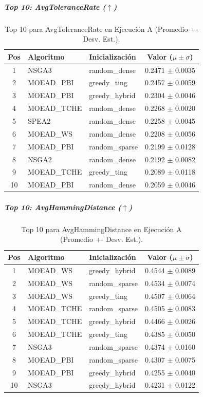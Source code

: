 \documentclass[a4paper,10pt]{article}
\begin{document}
\subparagraph{Top 10: AvgToleranceRate ($\uparrow$)}
\begin{table}[H]
    \centering
    \begin{tabular}{cllc}
        \toprule
        Pos & Algoritmo & Inicialización & Valor ($\mu \pm \sigma$) \\
        \midrule
        1 & NSGA3 & random\_dense & 0.2471 $\pm$ 0.0035 \\
        2 & MOEAD\_PBI & greedy\_ting & 0.2457 $\pm$ 0.0059 \\
        3 & MOEAD\_PBI & greedy\_hybrid & 0.2304 $\pm$ 0.0046 \\
        4 & MOEAD\_TCHE & random\_dense & 0.2268 $\pm$ 0.0020 \\
        5 & SPEA2 & random\_dense & 0.2258 $\pm$ 0.0045 \\
        6 & MOEAD\_WS & random\_dense & 0.2208 $\pm$ 0.0056 \\
        7 & MOEAD\_PBI & random\_sparse & 0.2199 $\pm$ 0.0128 \\
        8 & NSGA2 & random\_dense & 0.2192 $\pm$ 0.0082 \\
        9 & MOEAD\_TCHE & greedy\_ting & 0.2089 $\pm$ 0.0118 \\
        10 & MOEAD\_PBI & random\_dense & 0.2059 $\pm$ 0.0046 \\
        \bottomrule
    \end{tabular}
    \caption{Top 10 para AvgToleranceRate en Ejecución A (Promedio +- Desv. Est.).}
\end{table}

\subparagraph{Top 10: AvgHammingDistance ($\uparrow$)}
\begin{table}[H]
    \centering
    \begin{tabular}{cllc}
        \toprule
        Pos & Algoritmo & Inicialización & Valor ($\mu \pm \sigma$) \\
        \midrule
        1 & MOEAD\_WS & greedy\_hybrid & 0.4544 $\pm$ 0.0089 \\
        2 & MOEAD\_WS & random\_sparse & 0.4534 $\pm$ 0.0074 \\
        3 & MOEAD\_WS & greedy\_ting & 0.4507 $\pm$ 0.0064 \\
        4 & MOEAD\_TCHE & random\_sparse & 0.4505 $\pm$ 0.0083 \\
        5 & MOEAD\_TCHE & greedy\_hybrid & 0.4466 $\pm$ 0.0026 \\
        6 & MOEAD\_TCHE & greedy\_ting & 0.4385 $\pm$ 0.0050 \\
        7 & NSGA3 & random\_sparse & 0.4374 $\pm$ 0.0160 \\
        8 & MOEAD\_PBI & random\_sparse & 0.4307 $\pm$ 0.0075 \\
        9 & MOEAD\_PBI & greedy\_hybrid & 0.4255 $\pm$ 0.0040 \\
        10 & NSGA3 & greedy\_hybrid & 0.4231 $\pm$ 0.0122 \\
        \bottomrule
    \end{tabular}
    \caption{Top 10 para AvgHammingDistance en Ejecución A (Promedio +- Desv. Est.).}
\end{table}
\end{document}
